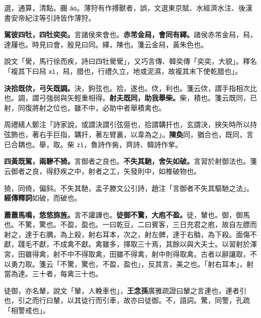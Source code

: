 \begin{quoting}選，通算，清點。嚻 \texttt{áo}。薄狩有作搏獸者，誤，文選東京賦、水經濟水注、後漢書安帝紀注等引詩皆作薄狩。\end{quoting}

\textbf{駕彼四牡，四牡奕奕。}{\footnotesize 言諸侯來會也。}\textbf{赤芾金舄，會同有繹。}{\footnotesize 諸侯赤芾金舄，舄，達屨也。時見曰會，殷見曰同。繹，陳也。箋云金舄，黃朱色也。}

\begin{quoting}說文「䮸，馬行徐而疾，詩曰四牡䮸䮸」，又巧言傳、韓奕傳「奕奕，大貌」。釋名「複其下曰舄 \texttt{xì}，舄，腊也，行禮久立，地或泥濕，故複其末下使乾腊也」。\end{quoting}

\textbf{決拾既佽，弓矢既調。}{\footnotesize 決，鉤弦也。拾，遂也。佽，利也。箋云佽，謂手指相次比也。調，謂弓強弱與矢輕重相得。}\textbf{射夫既同，助我舉柴。}{\footnotesize 柴，積也。箋云既同，已射，同復將射之位也，雖不中，必助中者舉積禽也。}

\begin{quoting}周禮繕人鄭注「詩家說，或謂決謂引弦彄也，拾謂韝扞也，玄謂決，挾矢時所以持弦飾也，著右手巨指，韝扞，著左臂裏，以韋為之」。\textbf{陳奐}同，猶合也，既同，言已合耦也。舉，取。柴 \texttt{zì}，魯詩作胔，齊詩、韓詩作㧘。\end{quoting}

\textbf{四黃既駕，兩驂不猗。}{\footnotesize 言御者之良也。}\textbf{不失其馳，舍矢如破。}{\footnotesize 言習於射御法也。箋云御者之良，得舒疾之中，射者之工，矢發則中，如椎破物也。}

\begin{quoting}猗，同倚，偏斜。不失其馳，孟子滕文公引詩，趙注「言御者不失其驅馳之法」。\textbf{經傳釋詞}如破，而破也。\end{quoting}

\textbf{蕭蕭馬鳴，悠悠旆旌。}{\footnotesize 言不讙譁也。}\textbf{徒御不驚，大庖不盈。}{\footnotesize 徒，輦也。御，御馬也。不驚，驚也。不盈，盈也。一曰乾豆，二曰賓客，三日充君之庖，故自左膘而射之，達于右腢，為上殺，射右耳本，次之，射左髀，達于右䯚，為下殺。面傷不獻，踐毛不獻，不成禽不獻。禽雖多，擇取三十焉，其餘以與大夫士。以習射於澤宮，田雖得禽，射不中不得取禽，田雖不得禽，射中則得取禽。古者以辭讓取，不以勇力取。箋云「不驚，驚也，不盈，盈也」，反其言，美之也。「射右耳本」，射當為達。三十者，每禽三十也。}

\begin{quoting}徒御，亦名輦，說文「輦，人輓車也」，\textbf{王念孫}廣雅疏證曰輦之言連也，連者引也，引之而行曰輦，以其徒行而引車，故亦曰徒御。不，語詞。驚，同警，孔疏「相警戒也」。\end{quoting}

